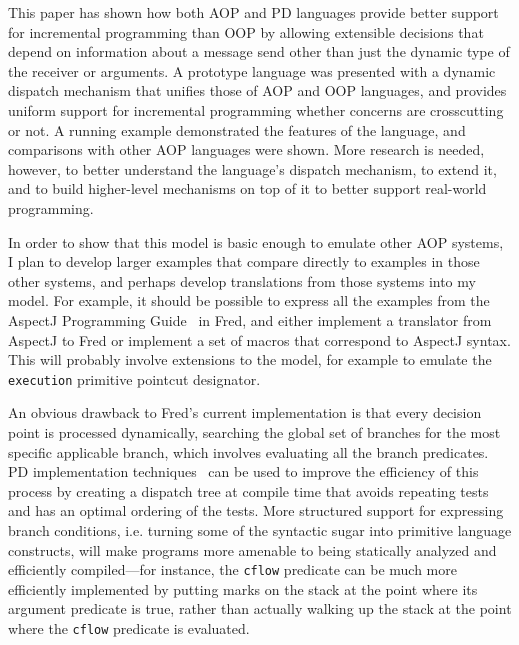\documentclass{acm_proc_article-sp}
\newcommand{\code}[1]{\texttt{#1}}
\begin{document}
This paper has shown how both AOP and PD languages provide
better support for incremental programming than OOP by allowing
extensible decisions that depend on information about a message send
other than just the dynamic type of the receiver or arguments.
A prototype language was presented with a dynamic dispatch mechanism that
unifies those of AOP and OOP languages, and provides uniform support
for incremental programming whether concerns are crosscutting or not.
A running example demonstrated the features of the language, and
comparisons with other AOP languages were shown.  More research is
needed, however, to better understand the language's dispatch
mechanism, to extend it, and to build higher-level mechanisms on top
of it to better support real-world programming.

In order to show that this model is basic enough to emulate other AOP
systems, I plan to develop larger examples that compare directly to
examples in those other systems, and perhaps develop translations from
those systems into my model.  For example, it should be possible to
express all the examples from the AspectJ Programming
Guide~\cite{AspectJ-prog-guide} in Fred, and either implement a
translator from AspectJ to Fred or implement a set of macros that
correspond to AspectJ syntax.  This will probably involve extensions
to the model, for example to emulate the \code{execution} primitive
pointcut designator.

An obvious drawback to Fred's current implementation is that every
decision point is processed dynamically, searching the global set of
branches for the most specific applicable branch, which involves
evaluating all the branch predicates.  PD implementation
techniques~\cite{efficient-pd} can be used to improve the efficiency
of this process by creating a dispatch tree at compile time that
avoids repeating tests and has an optimal ordering of the tests.
More structured support for expressing branch conditions, i.e. turning
some of the syntactic sugar into primitive language constructs, will
make programs more amenable to being statically analyzed and
efficiently compiled---for instance, the \code{cflow} predicate can be
much more efficiently implemented by putting marks on the stack at the
point where its argument predicate is true, rather than actually
walking up the stack at the point where the \code{cflow} predicate is
evaluated.
\end{document}
